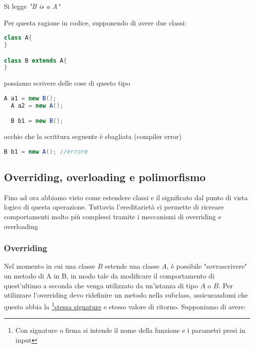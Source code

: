 \begin{center}
	\vskip3mm
	Si legge \textit{"B is a A"}
\end{center}
Per questa ragione in codice, supponendo di avere due classi:

\begin{lstlisting}[language = java, frame = none]
class A{
}

class B extends A{
}

\end{lstlisting}
\vskip3mm
possiamo scrivere delle cose di questo tipo
\vskip3mm
\begin{lstlisting}[language = java, frame = none]
  A a1 = new B();
  A a2 = new A();

  B b1 = new B();
\end{lstlisting}
\vskip3mm
occhio che la scrittura seguente è sbagliata (compiler error)
\vskip3mm
\begin{lstlisting}[language = java, frame = none]
  B b1 = new A(); //errore
\end{lstlisting}
\vskip3mm
\subsection{Overriding, overloading e polimorfismo}
Fino ad ora abbiamo visto come estendere classi e il significato dal punto di vista logico di questa operazione. Tuttavia l'ereditarietà ci permette di ricreare comportamenti molto più complessi tramite i meccanismi di overriding e overloading

\subsubsection{Overriding}
Nel momento in cui una classe $ B $ estende una classe $ A $, è possibile "sovrascrivere" un metodo di A in B, in modo tale da modificare il comportamento di quest'ultimo a seconda che venga utilizzato da un'istanza di tipo $ A $ o $ B $. Per utilizzare l'overriding devo ridefinire un metodo nella subclass, assicurandomi che questo abbia la  \footnote{Con signature o firma si intende il nome della funzione e i parametri presi in input}{\underline{stessa signature}} e stesso valore di ritorno. Supponiamo di avere:

